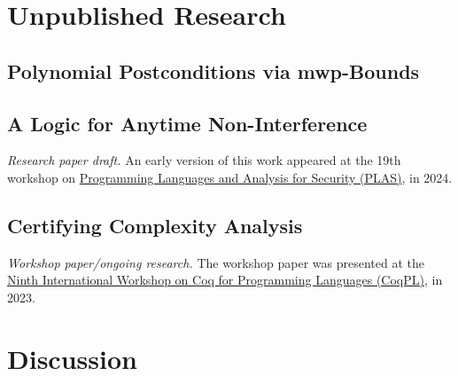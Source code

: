 \chapter{Unpublished Research}\label{ch:unpublished-research}

    \section{Polynomial Postconditions via mwp-Bounds}\label{sec:postcond}
    \pageIconFm
    \clearpage
    
    \clearpage

    \section{A Logic for Anytime Non-Interference}\label{sec:anytime}
    \pageIconSecurity
    {\emph{Research paper draft.}
    \newline\newline{}An early version of this work appeared at the 19th
    workshop on \href{https://plas24.github.io/}
    {Programming Languages and Analysis for Security (PLAS)}, in 2024.}
    \clearpage
    {}
    \clearpage

    \section{Certifying Complexity Analysis}\label{sec:mwp-calc-formal}
    \pageIconFm
    {\emph{Workshop paper/ongoing research.}
    \newline\newline{}The workshop paper was presented at
    the \href{https://popl23.sigplan.org/home/CoqPL-2023} {Ninth International
    Workshop on Coq for Programming Languages (CoqPL)}, in 2023.}
    \clearpage
    
    \clearpage

\chapter{Discussion}\label{ch:discussion}
\clearpage\newsectoff\newsect

